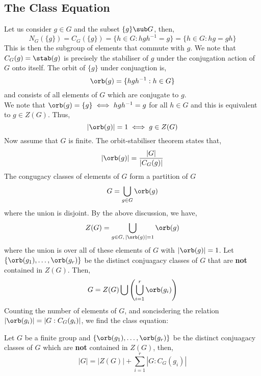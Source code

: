 \subsection{The Class Equation}
Let us consider $g \in G$ and the subset $\{g\} \sub G$, then,
$$ N_G(\{g\})=C_G(\{g\}) = \{h \in G : hgh^{-1} = g\} = \{h \in G : hg = gh\} $$
This is then the subgroup of elements that commute with $g$. We note that $C_G(g) = \stab(g)$ is precisely the stabiliser of $g$ under the conjugation action of $G$ onto itself. The orbit of $\{g\}$ under conjuagtion is,
$$ \orb(g) = \{hgh^{-1} : h \in G\} $$
and consists of all elements of $G$ which are conjugate to $g$. \\
We note that $\orb(g) = \{g\} \iff hgh^{-1} = g$ for all $h \in G$ and this is equivalent to $g \in Z(G)$. Thus,
$$ |\orb(g)| = 1 \iff g \in Z(G) $$
Now assume that $G$ is finite. The orbit-stabiliser theorem states that,
$$ |\orb(g)| = \frac{|G|}{|C_G(g)|} $$
The congugacy classes of elements of $G$ form a partition of $G$
$$ G = \bigcup_{g \in G} \orb(g) $$
where the union is disjoint. By the above discussion, we have,
$$ Z(G) = \bigcup_{g \in G,\,|\orb(g)|=1}\orb(g) $$
where the union is over all of these elements of $G$ with $|\orb(g)|=1$. Let $\{\orb(g_1),\dots, \orb(g_r)\}$ be the distinct conjuagacy classes of $G$ that are \textbf{not} contained in $Z(G)$. Then,
$$ G = Z(G)\bigcup \left(\bigcup_{i=1}^r \orb(g_i)\right)$$
Counting the number of elements of $G$, and soncisdering the relation $|\orb(g_i)| = |G : C_G(g_i)|$, we find the class equation:

\begin{nthm}
  Let $G$ be a finite group and $\{\orb(g_1),\dots, \orb(g_r)\}$ be the distinct conjuagacy classes of $G$ which are \textbf{not} contained in $Z(G)$, then,
  $$ |G| = |Z(G)| + \sum_{i=1}^r |G : C_G(g_i)| $$
\end{nthm}

